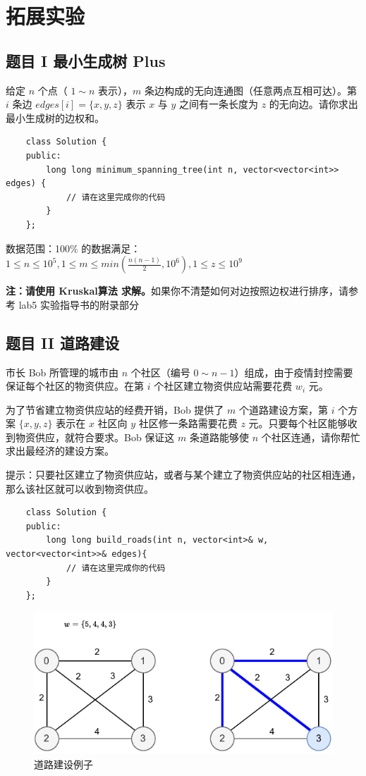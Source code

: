 \documentclass[12pt,a4paper]{article}
\begin{document}
\section{拓展实验}

\subsection{题目 I 最小生成树 Plus}

给定 $n$ 个点（ $1\sim n$ 表示），$m$ 条边构成的无向连通图（任意两点互相可达）。第 $i$ 条边 $edges[i] = \{x, y, z\}$ 表示 $x$ 与 $y$ 之间有一条长度为 $z$ 的无向边。请你求出最小生成树的边权和。

\begin{lstlisting}
    class Solution {
    public:
        long long minimum_spanning_tree(int n, vector<vector<int>> edges) {
            // 请在这里完成你的代码
        }
    };
\end{lstlisting}

数据范围：100\% 的数据满足：$1\le n \le 10^5, 1 \le m \le min(\frac{n(n-1)}{2}, 10^6), 1 \le z \le 10^9$

\textbf{注：请使用 Kruskal算法 求解。}如果你不清楚如何对边按照边权进行排序，请参考 lab5 实验指导书的附录部分

\subsection{题目 II 道路建设}

市长 Bob 所管理的城市由 $n$ 个社区（编号 $0\sim n-1$）组成，由于疫情封控需要保证每个社区的物资供应。在第 $i$ 个社区建立物资供应站需要花费 $w_i$ 元。

为了节省建立物资供应站的经费开销，Bob 提供了 $m$ 个道路建设方案，第 $i$ 个方案 $\{x, y, z\}$ 表示在 $x$ 社区向 $y$ 社区修一条路需要花费 $z$ 元。只要每个社区能够收到物资供应，就符合要求。Bob 保证这 $m$ 条道路能够使 $n$ 个社区连通，请你帮忙求出最经济的建设方案。

提示：只要社区建立了物资供应站，或者与某个建立了物资供应站的社区相连通，那么该社区就可以收到物资供应。
\begin{lstlisting}
    class Solution {
    public:
        long long build_roads(int n, vector<int>& w, vector<vector<int>>& edges){
            // 请在这里完成你的代码
        }
    };
\end{lstlisting}
\begin{figure}[h]
    \centering
    \includegraphics[width=12cm]{img/lab6/build_roads.pdf}
    \caption{道路建设例子}
    \label{fig:build_roads}
\end{figure}
\end{document}
